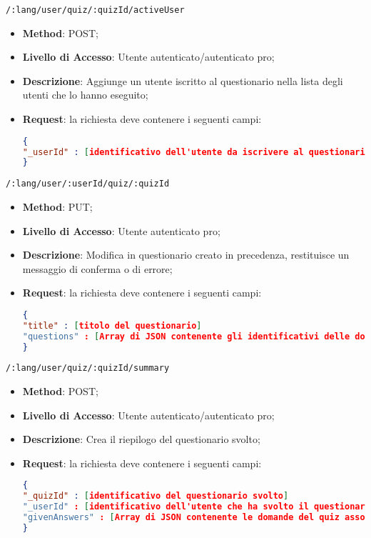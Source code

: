 	\item \texttt{/:lang/user/quiz/:quizId/activeUser}
	\begin{itemize}
		\item \textbf{Method}: POST;
		\item \textbf{Livello di Accesso}: Utente autenticato/autenticato pro;
		\item \textbf{Descrizione}: Aggiunge un utente iscritto al questionario nella lista degli utenti che lo hanno eseguito;
		\item \textbf{Request}: la richiesta deve contenere i seguenti campi:
\begin{lstlisting}[language=json,firstnumber=1]
{
"_userId" : [identificativo dell'utente da iscrivere al questionario]
}
\end{lstlisting}
	\end{itemize}
	
	
	\item \texttt{/:lang/user/:userId/quiz/:quizId}
	\begin{itemize}
		\item \textbf{Method}: PUT;
		\item \textbf{Livello di Accesso}: Utente autenticato pro;
		\item \textbf{Descrizione}: Modifica in questionario creato in precedenza, restituisce un messaggio di conferma o di errore;
		\item \textbf{Request}: la richiesta deve contenere i seguenti campi:
\begin{lstlisting}[language=json,firstnumber=1]
{
"title" : [titolo del questionario]
"questions" : [Array di JSON contenente gli identificativi delle domande che compongono il questionario]
}
\end{lstlisting}
	\end{itemize}
	
	
	\item \texttt{/:lang/user/quiz/:quizId/summary}
	\begin{itemize}
		\item \textbf{Method}: POST;
		\item \textbf{Livello di Accesso}: Utente autenticato/autenticato pro;
		\item \textbf{Descrizione}: Crea il riepilogo del questionario svolto;
		\item \textbf{Request}: la richiesta deve contenere i seguenti campi:
\begin{lstlisting}[language=json,firstnumber=1]
{
"_quizId" : [identificativo del questionario svolto]
"_userId" : [identificativo dell'utente che ha svolto il questionario]
"givenAnswers" : [Array di JSON contenente le domande del quiz associate alle risposte date dall'utente]
}
\end{lstlisting}
	\end{itemize}